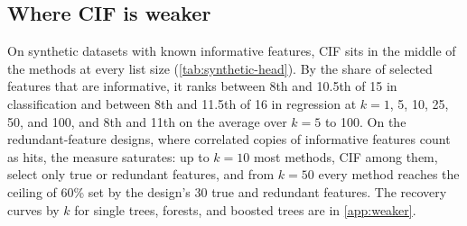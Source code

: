 \subsection{Where CIF is weaker}
\label{sec:boundary}

\label{sec:synthetic-recovery}%
On synthetic datasets with known informative features, CIF sits in the middle
of the methods at every list size (\cref{tab:synthetic-head}). By the share of
selected features that are informative, it ranks between 8th and 10.5th of 15
in classification and between 8th and 11.5th of 16 in regression at $k=1$, 5,
10, 25, 50, and 100, and 8th and 11th on the average over $k=5$ to 100. On the
redundant-feature designs, where correlated copies of informative features count
as hits, the measure saturates: up to $k=10$ most methods, CIF among them,
select only true or redundant features, and from $k=50$ every method reaches
the ceiling of 60\% set by the design's 30 true and redundant features. The
recovery curves by $k$ for single trees, forests, and boosted trees are in
\cref{app:weaker}.

